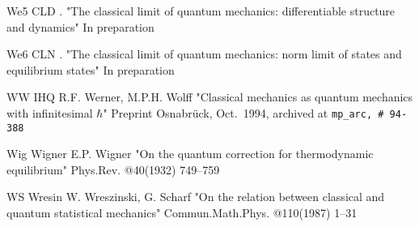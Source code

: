 \REF We5 CLD \Gref
    \sameauthor. {}
    "The classical limit of quantum mechanics: differentiable
    structure and dynamics"
    In preparation

\REF We6 CLN \Gref
    \sameauthor. {}
    "The classical limit of quantum mechanics: norm limit of states
    and equilibrium states"
    In preparation

\REF WW IHQ \Gref
    R.F. Werner, M.P.H. Wolff
    "Classical mechanics as quantum mechanics with infinitesimal
    $\hbar$"
    Preprint Osnabr\"uck, Oct.~1994,
    archived at {\tt mp\_arc, \# 94-388}

\REF Wig Wigner \Jref
    E.P. Wigner
    "On the quantum correction for thermodynamic equilibrium"
    Phys.Rev. @40(1932) 749--759

\REF WS Wresin \Jref
    W. Wreszinski, G. Scharf
    "On the relation between classical and quantum statistical
    mechanics"
    Commun.Math.Phys. @110(1987) 1--31

\bye
